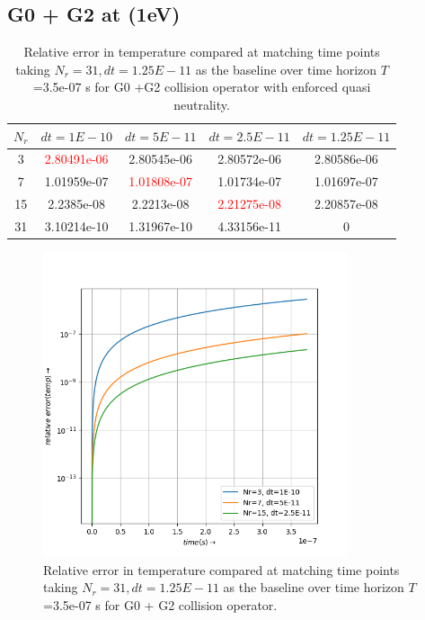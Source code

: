 \documentclass{article}
\begin{document}
\subsection{G0 + G2 at (1eV)}
\begin{table}[H]
	\centering
	\begin{tabular}{|c|c|c|c|c|}
		\hline
		$N_r$ & $dt=1E-10$ & $dt=5E-11$ & $dt=2.5E-11$ & $dt=1.25E-11$\\
		\hline
		 3  & \textcolor{red}{2.80491e-06} & 2.80545e-06 &  2.80572e-06  &  2.80586e-06 \\
		 7  & 1.01959e-07 & \textcolor{red}{1.01808e-07} &  1.01734e-07  &  1.01697e-07 \\
		15  & 2.2385e-08  & 2.2213e-08  &  \textcolor{red}{2.21275e-08}  &  2.20857e-08 \\
		31  & 3.10214e-10 & 1.31967e-10 &  4.33156e-11  &  0 \\
		\hline
	\end{tabular}
\caption{Relative error in temperature compared at matching time points taking $N_r=31,dt=1.25E-11$ as the baseline over time horizon $T$=3.5e-07 s for G0 +G2 collision operator with enforced quasi neutrality.}
\end{table}

\begin{figure}[H]
	\centering
	\includegraphics[width=0.8\textwidth]{fig/g02_temp_convergence.png}
	\caption{Relative error in temperature compared at matching time points taking $N_r=31,dt=1.25E-11$ as the baseline over time horizon $T$=3.5e-07 s for G0 + G2 collision operator. }
\end{figure}
\end{document}
